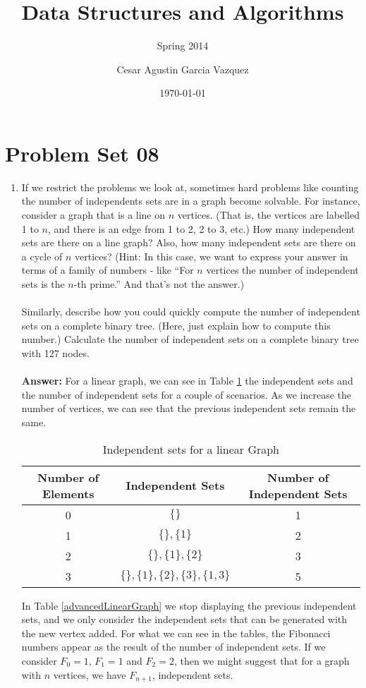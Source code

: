 \documentclass[tikz, 12pt]{scrartcl}
\title{Data Structures and Algorithms}
\subtitle{Spring 2014}
\author{Cesar Agustin Garcia Vazquez}
\date{\today}                                           %
\begin{document}
\maketitle
\section{Problem Set 08}

\begin{enumerate}
	\item If we restrict the problems we look at, sometimes hard problems like counting the number of independents sets are in a graph become solvable. For instance, consider a graph that is a line on $n$ vertices. (That is, the vertices are labelled 1 to $n$, and there is an edge from 1 to 2, 2 to 3, etc.) How many independent sets are there on a line graph? Also, how many independent sets are there on a cycle of $n$ vertices? (Hint: In this case, we want to express your answer in terms of a family of numbers - like ``For $n$ vertices the number of independent sets is the $n$-th prime.'' And that's not the answer.)\\
	\\
	Similarly, describe how you could quickly compute the number of independent sets on a complete binary tree. (Here, just explain how to compute this number.) Calculate the number of independent sets on a complete binary tree with 127 nodes.\\
	\\
	\textbf{Answer:} For a linear graph, we can see in Table \ref{linearGraph} the independent sets and the number of independent sets for a couple of scenarios. As we increase the number of vertices, we can see that the previous independent sets remain the same.
	
\begin{longtable}{|c|c|c|}
\caption{Independent sets for a linear Graph\label{linearGraph}}\\
\hline
Number of Elements	&	Independent Sets	&	Number of Independent Sets\\
\hline
	0			&	$\{\}$									&	1		\\
	1			&	$\{\}, \{1\}$									&	2		\\
	2			&	$\{\}, \{1\}, \{2\}$								&	3		\\
	3			&	$\{\}, \{1\}, \{2\}, \{3\}, \{1, 3\}$					&	5		\\
\hline
\end{longtable}	 

In Table \ref{advancedLinearGraph} we stop displaying the previous independent sets, and we only consider the independent sets that can be generated with the new vertex added. For what we can see in the tables, the Fibonacci numbers appear as the result of the number of independent sets. If we consider $F_0 = 1$, $F_1 = 1$ and $F_2 = 2$, then we might suggest that for a graph with $n$ vertices, we have $F_{n + 1}$, independent sets.


\end{enumerate}
\end{document}

